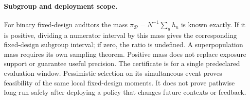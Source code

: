 \paragraph{Subgroup and deployment scope.}
For binary fixed-design auditors the mass
$\pi_{\mathcal D}=N^{-1}\sum_u h_u$ is known exactly. If it is positive,
dividing a numerator interval by this mass gives the corresponding
fixed-design subgroup interval; if zero, the ratio is undefined.
A superpopulation mass requires its own sampling theorem. Positive
mass does not replace exposure support or guarantee useful precision.
The certificate is for a single predeclared evaluation window.
Pessimistic selection on its simultaneous event proves feasibility of
the same local fixed-design moments. It does not prove pathwise
long-run safety after deploying a policy that changes future contexts
or feedback.
